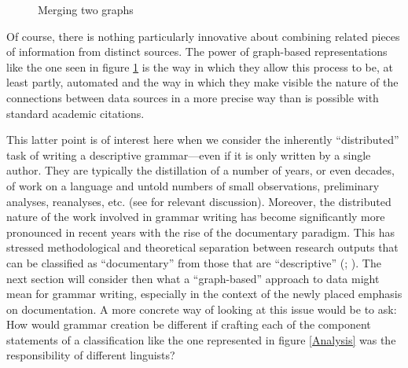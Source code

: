 \documentclass[12pt]{article}
\newcommand{\fref}[1]{figure \ref{#1}}
\newcommand\namecite{\citet}
\newcommand\citeboth{\citealt}
\begin{document}
\begin{figure}[ht]
\centering
{}
\caption{Merging two graphs \label{Merger}}
\end{figure}

Of course, there is nothing particularly innovative about combining related
pieces of information from distinct sources. The power of graph-based
representations like the one seen in \fref{Merger} is the way in which they
allow this process to be, at least partly, automated and the way in which they
make visible the nature of the connections between data sources in a more
precise way than is possible with standard academic citations.

This latter point is of interest here when we consider the inherently
``distributed'' task of writing a descriptive grammar---even if it is only
written by a single author. They are typically the distillation of a number of
years, or even decades, of work on a language and untold numbers of small
observations, preliminary analyses, reanalyses, etc. (see
\namecite[417--418]{Weber:2006} for relevant discussion). Moreover, the
distributed nature of the work involved in grammar writing has become
significantly more pronounced in recent years with the rise of the documentary
paradigm. This has stressed methodological and theoretical separation between
research outputs that can be classified as ``documentary'' from those that are
``descriptive'' (\citeboth{Himmelmann:1998};
\citeboth[168--169]{Woodbury:2011}). The next section will consider then what a
``graph-based'' approach to data might mean for grammar writing, especially in
the context of the newly placed emphasis on documentation. A more concrete way
of looking at this issue would be to ask: How would grammar creation be
different if crafting each of the component statements of a classification like
the one represented in \fref{Analysis} was the responsibility of different
linguists?
\end{document}
